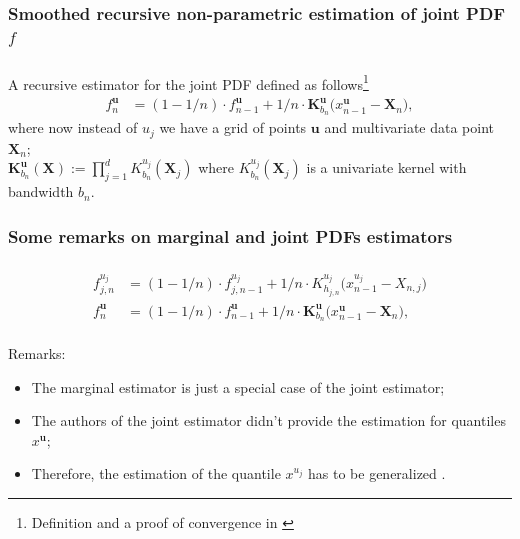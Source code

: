 \documentclass[aspectratio=169]{beamer}
\begin{document}
		\subsubsection{Smoothed recursive non-parametric estimation of joint PDF $ f $}
			\begin{frame}
				\frametitle{\insertsubsubsection}
				
				A recursive estimator for the joint PDF defined as follows\footnote{Definition and a proof of convergence in \textcite{Mokkadem2009}}
				\begin{align}
					f^{\mathbf{u}}_n &= (1- 1/n) \cdot f^{\mathbf{u}}_{n-1} + 1/n \cdot \mathbf{K}_{b_n}^{\mathbf{u}} \big(x_{n-1}^{\mathbf{u}} - \mathbf{X}_n\big),
				\end{align}
				where now instead of $ u_j $ we have a grid of points $ \mathbf{u} $ and multivariate data point $ \mathbf{X}_n $; \\
				$ \mathbf{K}_{b_n}^{\mathbf{u}}(\mathbf{X}) := \prod_{j=1}^{d}K_{b_{n}}^{u_j}(\mathbf{X}_j) $ where $ K_{b_{n}}^{u_j}(\mathbf{X}_j) $ is a univariate kernel with bandwidth $ b_{n} $.
				
			\end{frame}
			
			
		\subsubsection{Some remarks on marginal and joint PDFs estimators}
			\begin{frame}
				\frametitle{\insertsubsubsection}
				
				\begin{align}
					f^{u_j}_{j, n} &= (1- 1/n) \cdot f^{u_j}_{j, n-1} + 1/n \cdot K^{u_j}_{h_{j, n}}\big(x^{u_j}_{n-1} - X_{n, j}\big) \\
					f^{\mathbf{u}}_n &= (1- 1/n) \cdot f^{\mathbf{u}}_{n-1} + 1/n \cdot \mathbf{K}_{b_n}^{\mathbf{u}} \big(x_{n-1}^{\mathbf{u}} - \mathbf{X}_n\big),
				\end{align}\\[1em]
				
				Remarks:
				\begin{itemize}
					\item<2-> The marginal estimator is just a special case of the joint estimator;
					\item<3-> The authors of the joint estimator didn't provide the estimation for quantiles $ x^{\mathbf{u}} $;
					\item<4-> Therefore, the estimation of the quantile $ x^{u_j} $ has to be generalized \ding{51}.
				\end{itemize}
				
			\end{frame}
			
\end{document}
